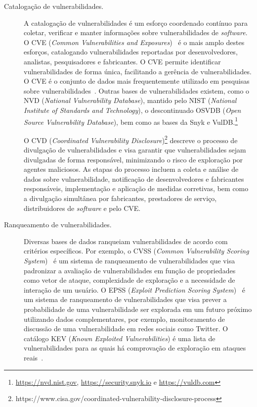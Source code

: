 \begin{description}

  \item[Catalogação de vulnerabilidades.] A catalogação de vulnerabilidades é um esforço coordenado contínuo para coletar, verificar e manter informações sobre vulnerabilidades de \emph{software}. O CVE (\emph{Common Vulnerabilities and Exposures})~\cite{mell2002cve} é o mais amplo destes esforços, catalogando vulnerabilidades reportadas por desenvolvedores, analistas, pesquisadores e fabricantes. O CVE permite identificar vulnerabilidades de forma única, facilitando a gerência de vulnerabilidades. O CVE é o conjunto de dados mais frequentemente utilizado em pesquisas sobre vulnerabilidades~\cite{le2021survey}. Outras bases de vulnerabilidades existem, como o NVD (\emph{National Vulnerability Database}), mantido pelo NIST (\emph{National Institute of Standards and Technology}), o descontinuado OSVDB (\emph{Open Source Vulnerability Database}), bem como as bases da Snyk e VulDB.\footnote{\url{https://nvd.nist.gov}, \url{https://security.snyk.io} e \url{https://vuldb.com}}

  O CVD (\emph{Coordinated Vulnerability Disclosure})\footnote{https://www.cisa.gov/coordinated-vulnerability-disclosure-process} descreve o processo de divulgação de vulnerabilidades e visa garantir que vulnerabilidades sejam divulgadas de forma responsável, minimizando o risco de exploração por agentes maliciosos. As etapas do processo incluem a coleta e análise de dados sobre vulnerabilidade, notificação de desenvolvedores e fabricantes responsáveis, implementação e aplicação de medidas corretivas, bem como a divulgação simultânea por fabricantes, prestadores de serviço, distribuidores de \emph{software} e pelo CVE\@.

  \item[Ranqueamento de vulnerabilidades.] Diversas bases de dados ranqueiam vulnerabilidades de acordo com critérios específicos. Por exemplo, o CVSS (\emph{Common Vulnerability Scoring System})~\cite{mell2006cvss} é um sistema de ranqueamento de vulnerabilidades que visa padronizar a avaliação de vulnerabilidades em função de propriedades como vetor de ataque, complexidade de exploração e a necessidade de interação de um usuário. O EPSS (\emph{Exploit Prediction Scoring System})~\cite{jacobs2021epss} é um sistema de ranqueamento de vulnerabilidades que visa prever a probabilidade de uma vulnerabilidade ser explorada em um futuro próximo utilizando dados complementares, por exemplo, monitoramento de discussão de uma vulnerabilidade em redes sociais como Twitter. O catálogo KEV (\emph{Known Exploited Vulnerabilities}) é uma lista de vulnerabilidades para as quais há comprovação de exploração em ataques reais~\cite{lim23kve}.


\end{description}
